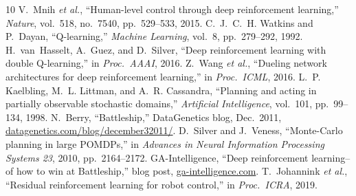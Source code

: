 \documentclass[conference,10pt]{IEEEtran}
\begin{document}
\begin{thebibliography}{10}
 V.~Mnih \emph{et al.}, ``Human-level control through deep
reinforcement learning,'' \emph{Nature}, vol.~518, no.~7540, pp.~529--533, 2015.
 C.~J.~C.~H. Watkins and P.~Dayan, ``Q-learning,''
\emph{Machine Learning}, vol.~8, pp.~279--292, 1992.
 H.~van~Hasselt, A.~Guez, and D.~Silver, ``Deep
reinforcement learning with double Q-learning,'' in \emph{Proc.\ AAAI}, 2016.
 Z.~Wang \emph{et al.}, ``Dueling network architectures for
deep reinforcement learning,'' in \emph{Proc.\ ICML}, 2016.
 L.~P. Kaelbling, M.~L. Littman, and A.~R. Cassandra,
``Planning and acting in partially observable stochastic domains,''
\emph{Artificial Intelligence}, vol.~101, pp.~99--134, 1998.
 N.~Berry, ``Battleship,'' DataGenetics blog, Dec.\ 2011,
\url{datagenetics.com/blog/december32011/}.
 D.~Silver and J.~Veness, ``Monte-Carlo planning in large
POMDPs,'' in \emph{Advances in Neural Information Processing Systems 23}, 2010,
pp.~2164--2172.
 GA-Intelligence, ``Deep reinforcement learning--of how to win
at Battleship,'' blog post, \url{ga-intelligence.com}.
 T.~Johannink \emph{et al.}, ``Residual reinforcement
learning for robot control,'' in \emph{Proc.\ ICRA}, 2019.
\end{thebibliography}
\end{document}
